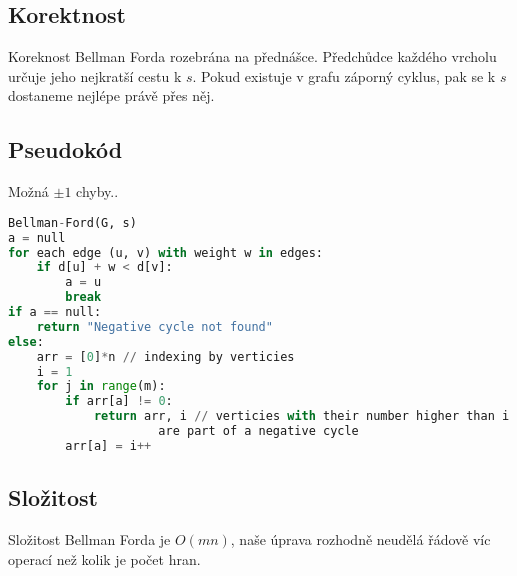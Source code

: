 \documentclass[a4paper]{article}
\begin{document}
\subsection{Korektnost}
Koreknost Bellman Forda rozebrána na přednášce. Předchůdce každého vrcholu určuje jeho nejkratší cestu k $s$. Pokud existuje v grafu záporný cyklus, pak se k $s$ dostaneme nejlépe právě přes něj.
\subsection{Pseudokód}
Možná $\pm 1$ chyby..
\begin{lstlisting}[language=Python]
Bellman-Ford(G, s)
a = null
for each edge (u, v) with weight w in edges:
	if d[u] + w < d[v]:
		a = u
		break
if a == null:
	return "Negative cycle not found"
else:
	arr = [0]*n // indexing by verticies
	i = 1
	for j in range(m):
		if arr[a] != 0:
			return arr, i // verticies with their number higher than i
					 are part of a negative cycle
		arr[a] = i++
\end{lstlisting}
\subsection{Složitost}
Složitost Bellman Forda je  $O(mn)$, naše úprava rozhodně neudělá řádově víc operací než kolik je počet hran.
\end{document}
